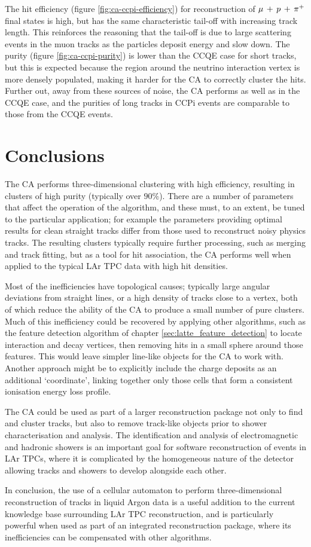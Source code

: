 The hit efficiency (figure \ref{fig:ca-ccpi-efficiency}) for reconstruction of $\mu\,+\,p\,+\,\pi^{+}$ final states is high, but has the same characteristic tail-off with increasing track length. This reinforces the reasoning that the tail-off is due to large scattering events in the muon tracks as the particles deposit energy and slow down. The purity (figure \ref{fig:ca-ccpi-purity}) is lower than the CCQE case for short tracks, but this is expected because the region around the neutrino interaction vertex is more densely populated, making it harder for the CA to correctly cluster the hits. Further out, away from these sources of noise, the CA performs as well as in the CCQE case, and the purities of long tracks in \acs{CCPi} events are comparable to those from the CCQE events.

\section{Conclusions}
The \ac{CA} performs three-dimensional clustering with high efficiency, resulting in clusters of high purity (typically over $90\%$). There are a number of parameters that affect the operation of the algorithm, and these must, to an extent, be tuned to the particular application; for example the parameters providing optimal results for clean straight tracks differ from those used to reconstruct noisy physics tracks. The resulting clusters typically require further processing, such as merging and track fitting, but as a tool for hit association, the CA performs well when applied to the typical \ac{LAr TPC} data with high hit densities.

Most of the inefficiencies have topological causes; typically large angular deviations from straight lines, or a high density of tracks close to a vertex, both of which reduce the ability of the CA to produce a small number of pure clusters. Much of this inefficiency could be recovered by applying other algorithms, such as the feature detection algorithm of chapter \ref{sec:latte_feature_detection} to locate interaction and decay vertices, then removing hits in a small sphere around those features. This would leave simpler line-like objects for the CA to work with. Another approach might be to explicitly include the charge deposits as an additional `coordinate', linking together only those cells that form a consistent ionisation energy loss profile.

The CA could be used as part of a larger reconstruction package not only to find and cluster tracks, but also to remove track-like objects prior to shower characterisation and analysis. The identification and analysis of electromagnetic and hadronic showers is an important goal for software reconstruction of events in LAr TPCs, where it is complicated by the homogeneous nature of the detector allowing tracks and showers to develop alongside each other.

In conclusion, the use of a cellular automaton to perform three-dimensional reconstruction of tracks in liquid Argon data is a useful addition to the current knowledge base surrounding \ac{LAr TPC} reconstruction, and is particularly powerful when used as part of an integrated reconstruction package, where its inefficiencies can be compensated with other algorithms.
